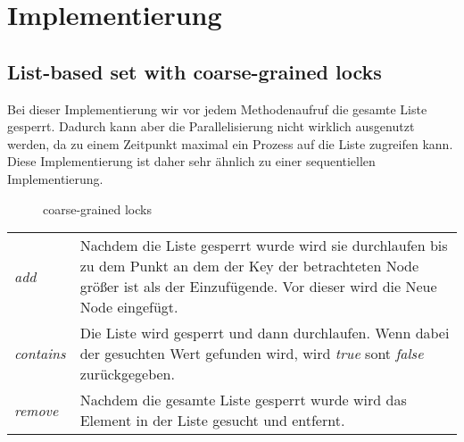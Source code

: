 \section{Implementierung}
\label{sec:implementation}
\subsection{List-based set with coarse-grained locks}

Bei dieser Implementierung wir vor jedem Methodenaufruf die gesamte Liste gesperrt. Dadurch kann aber die Parallelisierung nicht wirklich ausgenutzt werden, da zu einem Zeitpunkt maximal ein Prozess auf die Liste zugreifen kann. Diese Implementierung ist daher sehr ähnlich zu einer sequentiellen Implementierung.

\begin{figure}[H]
	\centering
	\caption{coarse-grained locks}
	\label{tik:coarse-grained}
\end{figure}

\begin{table}[H]
    \begin{tabularx}{\textwidth}{lX}
        \textit{add} & Nachdem die Liste gesperrt wurde wird sie durchlaufen bis zu dem Punkt an dem der Key der betrachteten Node größer ist als der Einzufügende. Vor dieser wird die Neue Node eingefügt. \\
        \textit{contains} & Die Liste wird gesperrt und dann durchlaufen. Wenn dabei der gesuchten Wert gefunden wird, wird \textit{true} sont \textit{false} zurückgegeben.\\
        \textit{remove} & Nachdem die gesamte Liste gesperrt wurde wird das Element in der Liste gesucht und entfernt.\\
    \end{tabularx}
\end{table}

